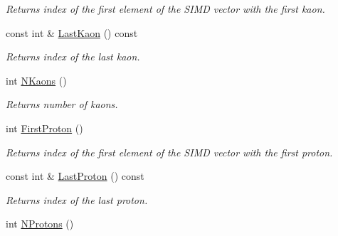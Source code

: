 \begin{DoxyCompactItemize}
\begin{DoxyCompactList}\small\item\em Returns index of the first element of the S\+I\+MD vector with the first kaon. \end{DoxyCompactList}\item 
const int \& \hyperlink{classKFPTrackVector_a8db26fc2e9e9a5d4df5584c58a384af5}{Last\+Kaon} () const \hypertarget{classKFPTrackVector_a8db26fc2e9e9a5d4df5584c58a384af5}{}\label{classKFPTrackVector_a8db26fc2e9e9a5d4df5584c58a384af5}

\begin{DoxyCompactList}\small\item\em Returns index of the last kaon. \end{DoxyCompactList}\item 
int \hyperlink{classKFPTrackVector_a7828dfdf8d8b132ad97e466d5603a21e}{N\+Kaons} ()\hypertarget{classKFPTrackVector_a7828dfdf8d8b132ad97e466d5603a21e}{}\label{classKFPTrackVector_a7828dfdf8d8b132ad97e466d5603a21e}

\begin{DoxyCompactList}\small\item\em Returns number of kaons. \end{DoxyCompactList}\item 
int \hyperlink{classKFPTrackVector_a37bfed5b009b8ed7b9ebf179e999e2b3}{First\+Proton} ()\hypertarget{classKFPTrackVector_a37bfed5b009b8ed7b9ebf179e999e2b3}{}\label{classKFPTrackVector_a37bfed5b009b8ed7b9ebf179e999e2b3}

\begin{DoxyCompactList}\small\item\em Returns index of the first element of the S\+I\+MD vector with the first proton. \end{DoxyCompactList}\item 
const int \& \hyperlink{classKFPTrackVector_a74ee23e23640850ca42473ff7dfdbfed}{Last\+Proton} () const \hypertarget{classKFPTrackVector_a74ee23e23640850ca42473ff7dfdbfed}{}\label{classKFPTrackVector_a74ee23e23640850ca42473ff7dfdbfed}

\begin{DoxyCompactList}\small\item\em Returns index of the last proton. \end{DoxyCompactList}\item 
int \hyperlink{classKFPTrackVector_a38cccedceb58b8c5bba68e02fd71e8fe}{N\+Protons} ()\hypertarget{classKFPTrackVector_a38cccedceb58b8c5bba68e02fd71e8fe}{}\label{classKFPTrackVector_a38cccedceb58b8c5bba68e02fd71e8fe}


\end{DoxyCompactItemize}

